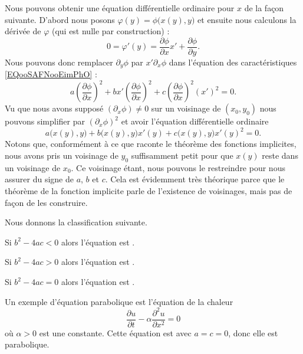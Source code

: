 Nous pouvons obtenir une équation différentielle ordinaire pour \( x\) de la façon suivante. D'abord nous posons \( \varphi(y)=\phi\big( x(y),y \big)\) et ensuite nous calculons la dérivée de \( \varphi\) (qui est nulle par construction) :
\begin{equation}
    0=\varphi'(y)=\frac{ \partial \phi }{ \partial x }x'+\frac{ \partial \phi }{ \partial y }.
\end{equation}
Nous pouvons donc remplacer \( \partial_y\phi\) par \( x'\partial_x\phi\) dans l'équation des caractéristiques \eqref{EQooSAFNooEimPhO} :
\begin{equation}
    a\left( \frac{ \partial \phi }{ \partial x } \right)^2+bx'\left( \frac{ \partial \phi }{ \partial x } \right)^2+c\left( \frac{ \partial \phi }{ \partial x } \right)^2(x')^2=0.
\end{equation}
Vu que nous avons supposé \( (\partial_x\phi)\neq 0\) sur un voisinage de \( (x_0,y_0)\) nous pouvons simplifier par \( (\partial_x\phi)^2\) et avoir l'équation différentielle ordinaire
\begin{equation}
    a\big( x(y),y \big)+b\big( x(y),y \big)x'(y)+c\big( x(y),y \big)x'(y)^2=0.
\end{equation}
Notons que, conformément à ce que raconte le théorème des fonctions implicites, nous avons pris un voisinage de \( y_0\) suffisamment petit pour que \( x(y)\) reste dans un voisinage de \( x_0\). Ce voisinage étant, nous pouvons le restreindre pour nous assurer du signe de \( a\), \( b\) et \( c\). Cela est évidemment très théorique parce que le théorème de la fonction implicite parle de l'existence de voisinages, mais pas de façon de les construire.

Nous donnons la classification suivante.

\begin{definition}
    Si \( b^2-4ac<0\) alors l'équation est .

    Si \( b^2-4ac>0\) alors l'équation est .

    Si \( b^2-4ac=0\) alors l'équation est .
\end{definition}

\begin{example}
    Un exemple d'équation parabolique est l'équation de la chaleur
    \begin{equation}
        \frac{ \partial u }{ \partial t }-\alpha\frac{ \partial^2u }{ \partial x^2 }=0
    \end{equation}
    où \( \alpha>0\) est une constante. Cette équation est avec \( a=c=0\), donc elle est parabolique.
\end{example}


